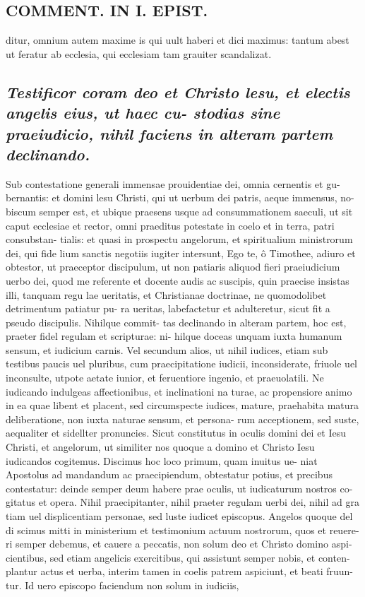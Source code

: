 \documentclass{article}
\begin{document}
\begin{pages}
\section*{COMMENT. IN I. EPIST. }
\marginpar{[ p.526 ]}\pstart ditur, omnium autem maxime is qui uult haberi et dici maximus: tantum abest ut feratur ab ecclesia, qui ecclesiam tam grauiter scandalizat.  \pend
{}
{}
\subsection*{\textit{Testificor coram deo et Christo lesu, et electis angelis eius, ut haec cu- stodias sine praeiudicio, nihil faciens in alteram partem declinando. }}\pstart Sub contestatione generali immensae prouidentiae dei, omnia cernentis et gu- bernantis: et domini lesu Christi, qui ut uerbum dei patris, aeque immensus, no- biscum semper est, et ubique praesens usque ad consummationem saeculi, ut sit caput ecclesiae et rector, omni praeditus potestate in coelo et in terra, patri consubstan- tialis: et quasi in prospectu angelorum, et spiritualium ministrorum dei, qui fide lium sanctis negotiis iugiter intersunt, Ego te, ô Timothee, adiuro et obtestor, ut praeceptor discipulum, ut non patiaris aliquod fieri praeiudicium uerbo dei, quod me referente et docente audis ac suscipis, quin praecise insistas illi, tanquam regu lae ueritatis, et Christianae doctrinae, ne quomodolibet detrimentum patiatur pu- ra ueritas, labefactetur et adulteretur, sicut fit a pseudo discipulis. Nihilque commit- tas declinando in alteram partem, hoc est, praeter fidel regulam et scripturae: ni- hilque doceas unquam iuxta humanum sensum, et iudicium carnis. Vel secundum alios, ut nihil iudices, etiam sub testibus paucis uel pluribus, cum praecipitatione iudicii, inconsiderate, friuole uel inconsulte, utpote aetate iunior, et feruentiore ingenio, et praeuolatili. Ne iudicando indulgeas affectionibus, et inclinationi na turae, ac propensiore animo in ea quae libent et placent, sed circumspecte iudices, mature, praehabita matura deliberatione, non iuxta naturae sensum, et persona- rum acceptionem, sed suste, aequaliter et sidellter pronuncies. Sicut constitutus in oculis domini dei et Iesu Christi, et angelorum, ut similiter nos quoque a domino et Christo Iesu iudicandos cogitemus. Discimus hoc loco primum, quam inuitus ue- niat Apostolus ad mandandum ac praecipiendum, obtestatur potius, et precibus contestatur: deinde semper deum habere prae oculis, ut iudicaturum nostros co- gitatus et opera. Nihil praecipitanter, nihil praeter regulam uerbi dei, nihil ad gra tiam uel displicentiam personae, sed luste iudicet episcopus. Angelos quoque del di scimus mitti in ministerium et testimonium actuum nostrorum, quos et reuere- ri semper debemus, et cauere a peccatis, non solum deo et Christo domino aspi- cientibus, sed etiam angelicis exercitibus, qui assistunt semper nobis, et conten- plantur actus et uerba, interim tamen in coelis patrem aspiciunt, et beati fruun- tur. Id uero episcopo faciendum non solum in iudiciis, 
\end{pages}
\end{document}

